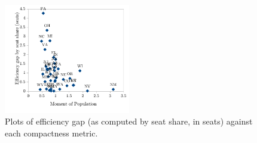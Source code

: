 \documentclass[12pt]{article}
\begin{document}
\begin{figure}
\begin{center}
      \includegraphics[width=0.49\textwidth]{sss-moment_pop.pdf}
      \parbox[b][2.8in][c]{0.49\textwidth}{\centering \parbox{0.4\textwidth}{\caption{Plots of efficiency gap (as computed by seat share, in seats) against each compactness metric.\label{f:compactnessplots}}}}
    \end{center}
  \end{figure}
\end{document}
